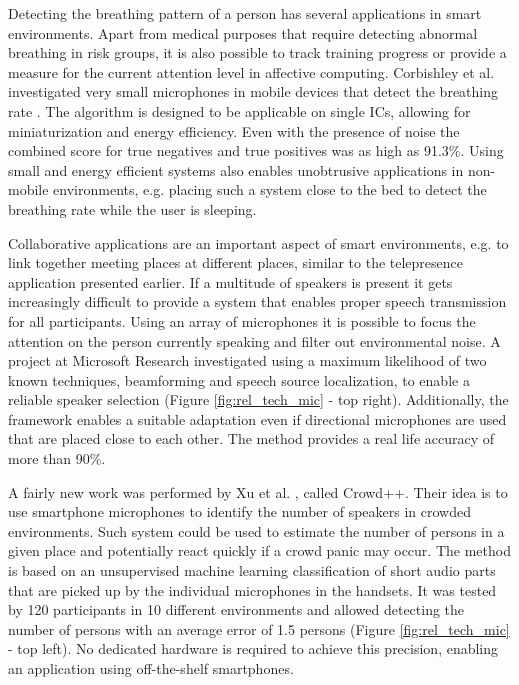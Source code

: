 Detecting the breathing pattern of a person has several applications in smart environments. Apart from medical purposes that require detecting abnormal breathing in risk groups, it is also possible to track training progress or provide a measure for the current attention level in affective computing. Corbishley et al. investigated very small microphones in mobile devices that detect the breathing rate \cite{corbishley2008breathing}. The algorithm is designed to be applicable on single ICs, allowing for miniaturization and energy efficiency. Even with the presence of noise the combined score for true negatives and true positives was as high as 91.3\%. Using small and energy efficient systems also enables unobtrusive applications in non-mobile environments, e.g. placing such a system close to the bed to detect the breathing rate while the user is sleeping.

Collaborative applications are an important aspect of smart environments, e.g. to link together meeting places at different places, similar to the telepresence application presented earlier. If a multitude of speakers is present it gets increasingly difficult to provide a system that enables proper speech transmission for all participants. Using an array of microphones it is possible to focus the attention on the person currently speaking and filter out environmental noise. A project at Microsoft Research investigated using a maximum likelihood of two known techniques, beamforming and speech source localization, to enable a reliable speaker selection \cite{zhang2008maximum} (Figure \ref{fig:rel_tech_mic} - top right). Additionally, the framework enables a suitable adaptation even if directional microphones are used that are placed close to each other. The method provides a real life accuracy of more than 90\%.

A fairly new work was performed by Xu et al. \cite{xu2013crowd++}, called Crowd++. Their idea is to use smartphone microphones to identify the number of speakers in crowded environments. Such system could be used to estimate the number of persons in a given place and potentially react quickly if a crowd panic may occur. The method is based on an unsupervised machine learning classification of short audio parts that are picked up by the individual microphones in the handsets. It was tested by 120 participants in 10 different environments and allowed detecting the number of persons with an average error of 1.5 persons (Figure \ref{fig:rel_tech_mic} - top left). No dedicated hardware is required to achieve this precision, enabling an application using off-the-shelf smartphones.

